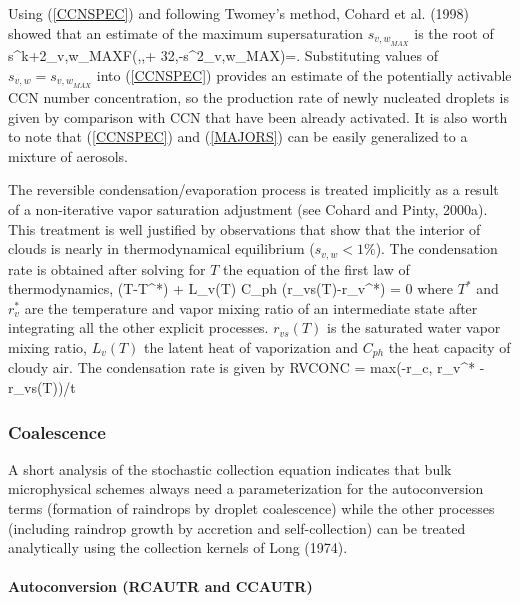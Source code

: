 Using (\ref{CCNSPEC}) and following Twomey's method, Cohard et al. (1998)
showed that an estimate of the maximum supersaturation $s_{{v,w}_{MAX}}$
is the root of
\beq\label{MAJORS}
s^{k+2}_{{v,w}_{MAX}}F(\mu,,+\frac
{3}{2},-\beta s^{2}_{{v,w}_{MAX}})=.
\eeq
\noindent Substituting values of $s_{v,w}=s_{{v,w}_{MAX}}$ into (\ref{CCNSPEC})
provides an estimate of the potentially activable CCN number concentration, 
so the production rate of newly nucleated droplets is given by comparison 
with CCN that have been already activated. It is also worth to note that
(\ref{CCNSPEC}) and (\ref{MAJORS}) can be easily generalized to a mixture 
of aerosols.

The reversible condensation/evaporation process is treated implicitly 
as a result of a non-iterative vapor saturation adjustment (see Cohard
and Pinty, 2000a).  This treatment is well justified by observations 
that show that the interior of clouds is nearly in thermodynamical equilibrium
($s_{v,w}<1 \%$). The condensation rate is obtained after solving for $T$ 
the equation of the first law of thermodynamics,
\beq\label{THCON}
(T-T^*) + {L_v(T) \over C_{ph}} (r_{vs}(T)-r_v^*) = 0
\eeq
\noindent where $T^*$ and $r_v^*$ are the temperature and vapor mixing 
ratio of an intermediate state after integrating all the other explicit 
processes. $r_{vs}(T)$ is the saturated water vapor mixing ratio, $L_v(T)$ 
the latent heat of vaporization and $C_{ph}$ the heat capacity of cloudy air. 
The condensation rate is given by
\beq\label{RCCON}
RVCONC = max(-r_c, r_v^* - r_{vs}(T))/\delta t
\eeq

\subsubsection{Coalescence}

A short analysis of the stochastic collection equation indicates that bulk 
microphysical schemes always need a 
parameterization for the autoconversion terms (formation of raindrops by droplet
coalescence) while the other processes (including raindrop growth by accretion 
and self-collection) can be treated analytically using the collection kernels 
of Long (1974).

\paragraph{Autoconversion (RCAUTR and CCAUTR)}

